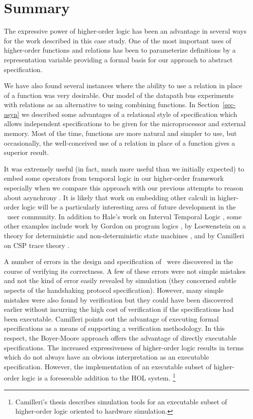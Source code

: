 \section{Summary}

The expressive power of higher-order logic has been
an advantage in several ways for the work described in
this case study.
One of the most important uses of higher-order functions and relations
has been to parameterize definitions by a representation variable
providing a formal basis for our approach to abstract
specification.

We have also found several instances where
the ability to use a relation in place of a function was
very desirable.
Our model of the datapath bus
experiments with relations as an alternative to using
combining functions.
In Section~\ref{sec-asyn} we described some advantages of
a relational style of specification which allows independent
specifications to be given for the microprocessor and
external memory.
Most of the time, functions are more natural and simpler
to use, but occasionally, the well-conceived use of a relation
in place of a function gives a superior result.

It was extremely useful (in fact, much more useful than we
initially expected)
to embed some operators
from temporal logic in our higher-order framework especially
when we compare this approach with our previous attempts
to reason about asynchrony
\cite{Joyce:stirling}.
It is likely that work on embedding other calculi
in higher-order logic will be a particularly interesting
area of future development in the \HOL\ user community.
In addition to Hale's work on Interval Temporal Logic \cite{Hale:thesis},
some other examples include work by Gordon on program logics
\cite{Gordon:banff87},
by Loewenstein on a theory for deterministic and non-deterministic
state machines \cite{Loewenstein:cornell},
and by Camilleri on CSP trace theory \cite{Camilleri:csp}.

A number of errors in the design and specification of \Tamarack\
were discovered in the course of verifying its correctness.
A few of these errors were not simple mistakes and not
the kind of error easily revealed by
simulation (they concerned
subtle aspects of the handshaking protocol specification).
However, many simple mistakes were also found by verification
but they could have been discovered earlier
without incurring the high cost of verification
if the specifications
had been executable.
Camilleri \cite{Camilleri:pisa} points out the advantage of executing
formal specifications as a means of supporting a verification
methodology.
In this respect, the Boyer-Moore approach
\cite{Hunt:thesis,Bevier87,Bevier89}
offers the advantage of directly executable specifications.
The increased expressiveness of higher-order logic results in
terms which do not always have an obvious
interpretation as an executable specification.
However,
the implementation of an executable subset of higher-order logic
is a foreseeable addition to the HOL system.
\footnote{
Camilleri's thesis \cite{Camilleri:thesis}
describes simulation tools for an executable
subset of higher-order logic oriented to hardware simulation.}

